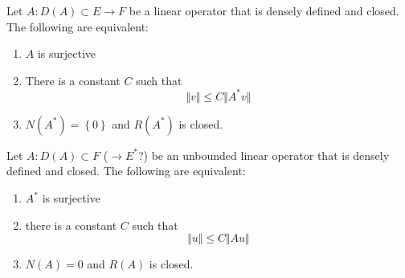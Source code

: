 \begin{thm}
	Let $A: D(A) \subset E \to F$ be a linear operator that is densely defined and closed. The following are equivalent:
	\begin{enumerate}
		\item $A$ is surjective
		\item There is a constant $C$ such that
			\[
			\Vert v \Vert \leq C \Vert A^{*}v \Vert
			\]
		\item $N(A^{*}) = \left\{ 0 \right\}$ and $R(A^{*})$ is closed.
	\end{enumerate}
\end{thm}

\begin{thm}
	Let $A: D(A) \subset F$ ($ \to E^{*}$?) be an unbounded linear operator that is densely defined and closed. The following are equivalent:
	\begin{enumerate}
		\item $ A^{*}$ is surjective
		\item there is a constant $C$ such that
			\[
			\Vert u \Vert \leq C \Vert Au \Vert
			\]
		\item $N(A) = 0$ and $R(A)$ is closed.
	\end{enumerate}
\end{thm}

